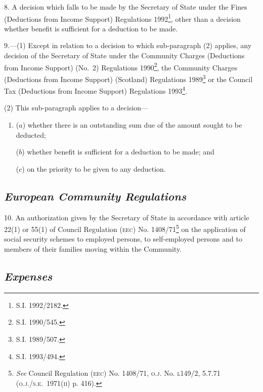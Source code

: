 \documentclass[12pt,a4paper]{article}
\begin{document}
8.  A decision which falls to be made by the Secretary of State under the Fines (Deductions from Income Support) Regulations 1992\footnote{\frenchspacing S.I. 1992/2182.}, other than 
a decision whether benefit is sufficient for a deduction to be made.  %


\medskip

9.—(1) Except in relation to a decision to which sub-paragraph (2) applies, any decision of the Secretary of State under the Community Charges (Deductions from Income Support) (No.\ 2) Regulations 1990\footnote{\frenchspacing S.I. 1990/545.}, the Community Charges (Deductions from Income Support) (Scotland) Regulations 1989\footnote{\frenchspacing S.I. 1989/507.} or the Council Tax (Deductions from Income Support) Regulations 1993\footnote{\frenchspacing S.I. 1993/494.}.%

(2) This sub-paragraph applies to a decision—
\begin{enumerate}\item[]
($a$) whether there is an outstanding sum due of the amount sought to be deducted;

($b$) whether benefit is sufficient for a deduction to be made; and

($c$) on the priority to be given to any deduction.
\end{enumerate}

\subsection*{\itshape European Community Regulations}

10.  An authorization given by the Secretary of State in accordance with article 22(1) or 55(1) of Council Regulation \textsc{\lowercase{(EEC)}} No. 1408/71\footnote{\frenchspacing \emph{See} Council Regulation \textsc{\lowercase{(EEC)}} No. 1408/71, \textsc{\lowercase{O.J.}} No. \textsc{\lowercase{L149/2, 5.7.71 (O.J./S.E.~1971(II)}} p. 416).} on the application of social security schemes to employed persons, to self-employed persons and to members of their families moving within the Community.

\subsection*{\itshape Expenses}
\end{document}
